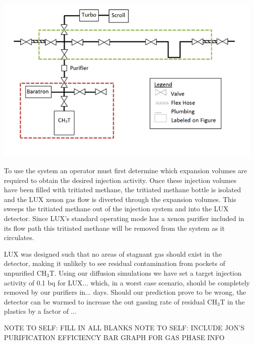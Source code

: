 \documentclass[a4paper,12pt]{article}
\begin{document}
\begin{center}
\includegraphics[scale=0.7]{Injection_Plumbing_Colored.png}
\end{center}

To use the system an operator must first determine which expansion volumes are required to obtain the desired injection activity.  Once these injection volumes have been filled with tritiated methane, the tritiated methane bottle is isolated and the LUX xenon gas flow is diverted through the expansion volumes.  This sweeps the tritiated methane out of the injection system and into the LUX detector.  Since LUX's standard operating mode has a xenon purifier included in its flow path this tritiated methane will be removed from the system as it circulates. 

LUX was designed such that no areas of stagnant gas should exist in the detector, making it unlikely to see residual contamination from pockets of unpurified CH$_3$T.  Using our diffusion simulations we have set a target injection activity of 0.1 bq for LUX... which, in a worst case scenario, should be completely removed by our purifiers in... days.  Should our prediction prove to be wrong, the detector can be warmed to increase the out gassing rate of residual CH$_3$T in the plastics by a factor of ...

NOTE TO SELF: FILL IN ALL BLANKS
NOTE TO SELF: INCLUDE JON'S PURIFICATION EFFICIENCY BAR GRAPH FOR GAS PHASE INFO
\end{document}
